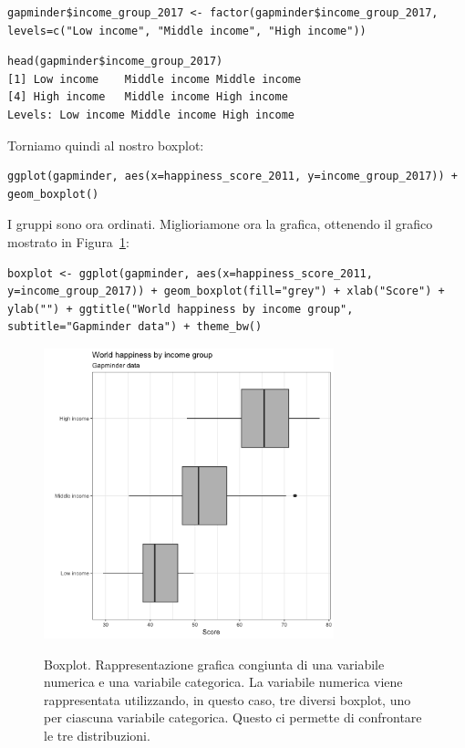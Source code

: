 \begin{lstlisting}[style=Rstylescript]
gapminder$income_group_2017 <- factor(gapminder$income_group_2017, levels=c("Low income", "Middle income", "High income"))	
\end{lstlisting}

\begin{lstlisting}[style=Rstyle]
head(gapminder$income_group_2017)
[1] Low income    Middle income Middle income
[4] High income   Middle income High income  
Levels: Low income Middle income High income
\end{lstlisting}
%
Torniamo quindi al nostro boxplot:

\begin{lstlisting}[style=Rstylescript]
ggplot(gapminder, aes(x=happiness_score_2011, y=income_group_2017)) + geom_boxplot()
\end{lstlisting}
%
I gruppi sono ora ordinati. Miglioriamone ora la grafica, ottenendo il grafico mostrato in Figura~\ref{fig:boxplot}:


\begin{lstlisting}[style=Rstylescript]
boxplot <- ggplot(gapminder, aes(x=happiness_score_2011, y=income_group_2017)) + geom_boxplot(fill="grey") + xlab("Score") + ylab("") + ggtitle("World happiness by income group", subtitle="Gapminder data") + theme_bw()
\end{lstlisting}

\begin{figure}[h]
 \centering
  \includegraphics[width=0.75\textwidth]{images/boxplot.png}
  \label{fig:boxplot}
 \caption{Boxplot. Rappresentazione grafica congiunta di una variabile numerica e una variabile categorica. La variabile numerica viene rappresentata utilizzando, in questo caso, tre diversi boxplot, uno per ciascuna variabile categorica. Questo ci permette di confrontare le tre distribuzioni.}
\end{figure}


